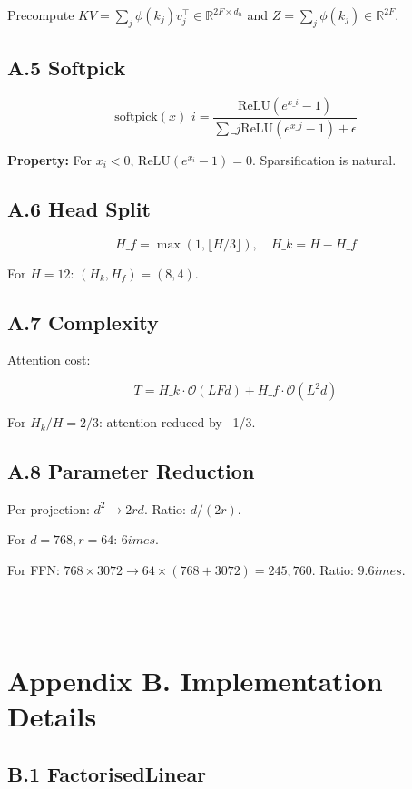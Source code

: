 Precompute $KV = \sum_j \phi(k_j) v_j^\top \in \mathbb{R}^{2F \times d_h}$ 
and $Z = \sum_j \phi(k_j) \in \mathbb{R}^{2F}$.

\subsection{A.5 Softpick}

\[
\text{softpick}(x)\_i = \frac{\text{ReLU}(e^{x\_i} - 1)}{\sum\_j \text{ReLU}(e^{x\_j} - 1) + \epsilon}
\]

\textbf{Property:} For $x_i < 0$, $\text{ReLU}(e^{x_i} - 1) = 0$. Sparsification 
is natural.

\subsection{A.6 Head Split}

\[
H\_f = \max(1, \lfloor H/3 \rfloor), \quad H\_k = H - H\_f
\]

For $H = 12$: $(H_k, H_f) = (8, 4)$.

\subsection{A.7 Complexity}

Attention cost:

\[
T = H\_k \cdot \mathcal{O}(L F d) + H\_f \cdot \mathcal{O}(L^2 d)
\]

For $H_k/H = 2/3$: attention reduced by ~1/3.

\subsection{A.8 Parameter Reduction}

Per projection: $d^2 \to 2rd$. Ratio: $d / (2r)$.

For $d = 768, r = 64$: $6	imes$.

For FFN: $768 \times 3072 \to 64 \times (768 + 3072) = 245,760$. 
Ratio: $9.6	imes$.
\begin{lstlisting}

---
\end{lstlisting}


\section{Appendix B. Implementation Details}

\subsection{B.1 FactorisedLinear}

